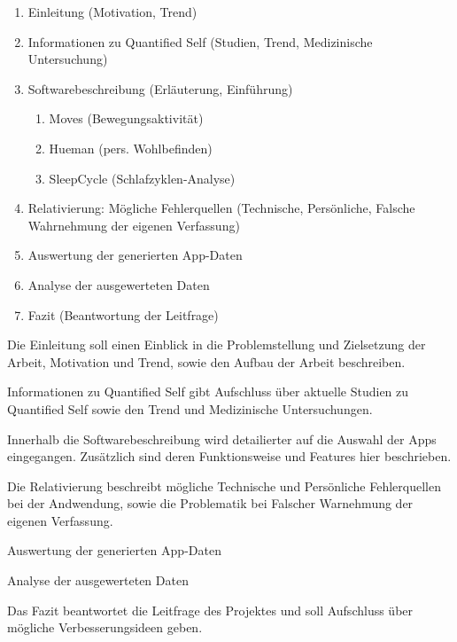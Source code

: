 \begin{enumerate}
\def\labelenumi{\arabic{enumi}.}
\itemsep1pt\parskip0pt
\item
  Einleitung (Motivation, Trend)
\item
  Informationen zu Quantified Self (Studien, Trend, Medizinische
  Untersuchung)
\item
  Softwarebeschreibung (Erläuterung, Einführung)

  \begin{enumerate}
  \def\labelenumii{\alph{enumii}.}
  \itemsep1pt\parskip0pt
  \item
    Moves (Bewegungsaktivität)\\
  \item
    Hueman (pers. Wohlbefinden)\\
  \item
    SleepCycle (Schlafzyklen-Analyse)
  \end{enumerate}
\item
  Relativierung: Mögliche Fehlerquellen (Technische, Persönliche,
  Falsche Wahrnehmung der eigenen Verfassung)
\item
  Auswertung der generierten App-Daten
\item
  Analyse der ausgewerteten Daten
\item
  Fazit (Beantwortung der Leitfrage)
\end{enumerate}

Die Einleitung soll einen Einblick in die Problemstellung und
Zielsetzung der Arbeit, Motivation und Trend, sowie den Aufbau der
Arbeit beschreiben.

Informationen zu Quantified Self gibt Aufschluss über aktuelle Studien
zu Quantified Self sowie den Trend und Medizinische Untersuchungen.

Innerhalb die Softwarebeschreibung wird detailierter auf die Auswahl der
Apps eingegangen. Zusätzlich sind deren Funktionsweise und Features hier
beschrieben.

Die Relativierung beschreibt mögliche Technische und Persönliche
Fehlerquellen bei der Andwendung, sowie die Problematik bei Falscher
Warnehmung der eigenen Verfassung.

Auswertung der generierten App-Daten

Analyse der ausgewerteten Daten

Das Fazit beantwortet die Leitfrage des Projektes und soll Aufschluss
über mögliche Verbesserungsideen geben.

